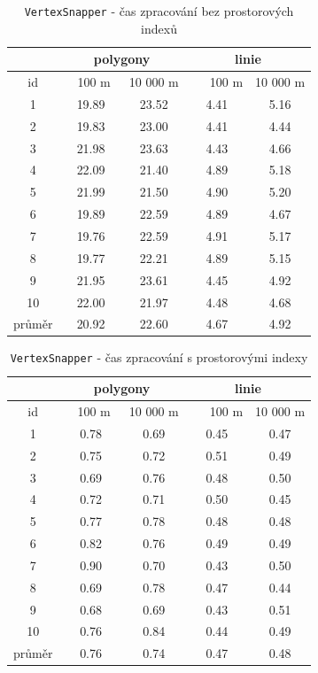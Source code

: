 \begin{table}
 \centering
  \small
   \caption{\texttt{Vertex\-Snapper} -
	    čas zpracování bez prostorových indexů}
  \begin{tabular}{|c|c|c|c|c|}
   \hline
      & \multicolumn{2}{c|}{polygony} & 
 	\multicolumn{2}{c|}{linie} \\
   \hline
    id  &  ~~100 m~ & 10 000 m & ~~~100 m & 10 000 m\\
   \hline
   \hline
 1  & 19.89 & 23.52 & 4.41 & 5.16 \\ 
 2  & 19.83 & 23.00 & 4.41 & 4.44 \\
 3  & 21.98 & 23.63 & 4.43 & 4.66 \\
 4  & 22.09 & 21.40 & 4.89 & 5.18 \\
 5  & 21.99 & 21.50 & 4.90 & 5.20 \\
 6  & 19.89 & 22.59 & 4.89 & 4.67 \\
 7  & 19.76 & 22.59 & 4.91 & 5.17 \\
 8  & 19.77 & 22.21 & 4.89 & 5.15 \\
 9  & 21.95 & 23.61 & 4.45 & 4.92 \\
 10 & 22.00 & 21.97 & 4.48 & 4.68 \\
   \hline
   \hline
   průměr & 20.92 & 22.60 & 4.67 & 4.92 \\
   \hline
  \end{tabular}
   \label{tab:vs-bez}
\end{table}
 
\begin{table}
 \centering
  \small
   \caption{\texttt{Vertex\-Snapper} -
	    čas zpracování s prostorovými indexy}
  \begin{tabular}{|c|c|c|c|c|}
   \hline
      & \multicolumn{2}{c|}{polygony} & 
 	\multicolumn{2}{c|}{linie} \\
   \hline
    id  &  ~~100 m~ & 10 000 m & ~~~100 m & 10 000 m\\
   \hline
   \hline
   1  & 0.78 & 0.69 &  0.45 & 0.47 \\
   2  & 0.75 & 0.72 &  0.51 & 0.49 \\
   3  & 0.69 & 0.76 &  0.48 & 0.50 \\
   4  & 0.72 & 0.71 &  0.50 & 0.45 \\
   5  & 0.77 & 0.78 &  0.48 & 0.48 \\
   6  & 0.82 & 0.76 &  0.49 & 0.49 \\
   7  & 0.90 & 0.70 &  0.43 & 0.50 \\
   8  & 0.69 & 0.78 &  0.47 & 0.44 \\
   9  & 0.68 & 0.69 &  0.43 & 0.51 \\
   10 & 0.76 & 0.84 &  0.44 & 0.49 \\
   \hline
   \hline
   průměr & 0.76 & 0.74 & 0.47 & 0.48 \\
   \hline
  \end{tabular}
   \label{tab:vs-s}
\end{table}
 
